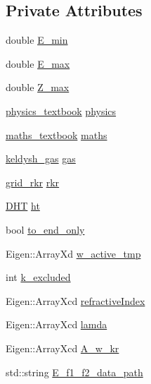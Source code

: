 \subsection*{Private Attributes}
\begin{DoxyCompactItemize}
\item 
double \mbox{\hyperlink{classpropagation_ab5a753d760a135806a93b9082e8019fb}{E\+\_\+min}}
\item 
double \mbox{\hyperlink{classpropagation_a5d2b4202c82db47a1276c0ef1f7ad8c8}{E\+\_\+max}}
\item 
double \mbox{\hyperlink{classpropagation_ae0b2d1a8fa0e59d37e124a0ba1f12dd2}{Z\+\_\+max}}
\item 
\mbox{\hyperlink{classphysics__textbook}{physics\+\_\+textbook}} \mbox{\hyperlink{classpropagation_a42a6e725e3dd53cf94192bf93c31c8de}{physics}}
\item 
\mbox{\hyperlink{classmaths__textbook}{maths\+\_\+textbook}} \mbox{\hyperlink{classpropagation_ab5a5024c2d06c0dad06c745af7c6416c}{maths}}
\item 
\mbox{\hyperlink{classkeldysh__gas}{keldysh\+\_\+gas}} \mbox{\hyperlink{classpropagation_a4152dc9a226a7ff91aff2338d0bd813f}{gas}}
\item 
\mbox{\hyperlink{classgrid__rkr}{grid\+\_\+rkr}} \mbox{\hyperlink{classpropagation_a3d37531bb5918f972544d242aec7e72b}{rkr}}
\item 
\mbox{\hyperlink{class_d_h_t}{D\+HT}} \mbox{\hyperlink{classpropagation_a044544975e7fc2ec3df9a55d92f8cc90}{ht}}
\item 
bool \mbox{\hyperlink{classpropagation_a939b7a85171b3e5ce06560a3885ef0ca}{to\+\_\+end\+\_\+only}}
\item 
Eigen\+::\+Array\+Xd \mbox{\hyperlink{classpropagation_a07a80b67a345e3e9d8e934d2265ba288}{w\+\_\+active\+\_\+tmp}}
\item 
int \mbox{\hyperlink{classpropagation_a76f3651eac23a69c1259dc0406fbe0d9}{k\+\_\+excluded}}
\item 
Eigen\+::\+Array\+Xcd \mbox{\hyperlink{classpropagation_aba601a0df3c63b13215c55d8ade2bcd7}{refractive\+Index}}
\item 
Eigen\+::\+Array\+Xcd \mbox{\hyperlink{classpropagation_a5ae0154dc8db04188ba92e10ba981000}{lamda}}
\item 
Eigen\+::\+Array\+Xcd \mbox{\hyperlink{classpropagation_a4df23dd19a8cca8a4cb032718dc2b258}{A\+\_\+w\+\_\+kr}}
\item 
std\+::string \mbox{\hyperlink{classpropagation_abd78bf6976f2b2d0a3fc82b9cf0d9dc6}{E\+\_\+f1\+\_\+f2\+\_\+data\+\_\+path}}

\end{DoxyCompactItemize}
